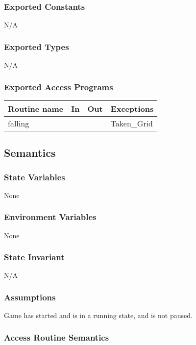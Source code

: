 \documentclass[12pt]{article}
\begin{document}
\subsubsection* {Exported Constants}
N/A
\subsubsection* {Exported Types}

N/A

\subsubsection* {Exported Access Programs}

\begin{tabular}{| l | l | l | l |}
\hline
\textbf{Routine name} & \textbf{In} & \textbf{Out} & \textbf{Exceptions}\\
\hline
falling &  &  & Taken\_Grid \\
\hline
\end{tabular}

\subsection* {Semantics}

\subsubsection* {State Variables}

None

\subsubsection* {Environment Variables}
None
\subsubsection* {State Invariant}

N/A

\subsubsection* {Assumptions}
Game has started and is in a running state, and is not paused.

\subsubsection* {Access Routine Semantics}
\end{document}
